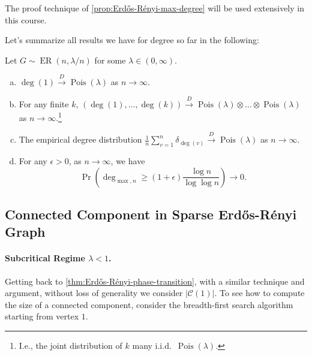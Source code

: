 \begin{remark}
	The proof technique of \autoref{prop:Erdős-Rényi-max-degree} will be used extensively in this course.
\end{remark}

Let's summarize all results we have for degree so far in the following:

\begin{theorem}\label{thm:degree-of-sparse-Erdős-Rényi-graph}
	Let \(G \sim \operatorname{ER}(n, \lambda / n) \) for some \(\lambda \in (0, \infty )\).
	\begin{enumerate}[(a)]
		\item\label{thm:degree-of-sparse-Erdős-Rényi-graph-a} \(\deg (1) \overset{D}{\to} \operatorname{Pois}(\lambda ) \) as \(n\to \infty \).
		\item\label{thm:degree-of-sparse-Erdős-Rényi-graph-b} For any finite \(k\), \((\deg (1), \dots , \deg (k)) \overset{D}{\to} \operatorname{Pois}(\lambda ) \otimes \dots \otimes \operatorname{Pois}(\lambda ) \) as \(n\to \infty \).\footnote{I.e., the joint distribution of \(k\) many i.i.d.\ \(\operatorname{Pois}(\lambda ) \).}
		\item\label{thm:degree-of-sparse-Erdős-Rényi-graph-c} The empirical degree distribution \(\frac{1}{n} \sum_{v=1}^{n} \delta _{\deg (v)} \overset{D}{\to} \operatorname{Pois}(\lambda ) \) as \(n\to \infty \).
		\item\label{thm:degree-of-sparse-Erdős-Rényi-graph-d} For any \(\epsilon > 0\), as \(n \to \infty \), we have
		      \[
			      \Pr_{}\left( \deg _{\max , n} \geq (1 + \epsilon ) \frac{\log n}{\log \log n} \right)
			      \to 0.
		      \]
	\end{enumerate}
\end{theorem}

\subsection{Connected Component in Sparse Erdős-Rényi Graph}
\paragraph{Subcritical Regime \(\lambda < 1\).}
Getting back to \autoref{thm:Erdős-Rényi-phase-transition}, with a similar technique and argument, without loss of generality we consider \(\lvert \mathcal{C} (1) \rvert \). To see how to compute the size of a connected component, consider the breadth-first search algorithm starting from vertex \(1\).

